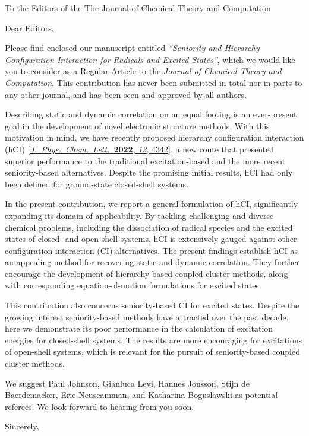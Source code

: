 \documentclass[10pt]{letter}
\begin{document}
\begin{letter}%
{To the Editors of the The Journal of Chemical Theory and Computation}

\opening{Dear Editors,}

\justifying
Please find enclosed our manuscript entitled \textit{``Seniority and Hierarchy Configuration Interaction for Radicals and Excited States''}, 
which we would like you to consider as a Regular Article to the \textit{Journal of Chemical Theory and Computation}.
This contribution has never been submitted in total nor in parts to any other journal, and has been seen and approved by all authors.

Describing static and dynamic correlation on an equal footing is an ever-present goal in the development of novel electronic structure methods.
With this motivation in mind, we have recently proposed hierarchy configuration interaction (hCI)
[\href{https://doi.org/10.1021/acs.jpclett.2c00730}{\textit{J.~Phys.~Chem.~Lett.}~\textbf{2022}, \textit{13}, 4342}],
a new route that presented superior performance to the traditional excitation-based and the more recent seniority-based alternatives.
Despite the promising initial results, hCI had only been defined for ground-state closed-shell systems.

In the present contribution, we report a general formulation of hCI, significantly expanding its domain of applicability.
By tackling challenging and diverse chemical problems, including the dissociation of radical species and the excited states of closed- and open-shell systems,
hCI is extensively gauged against other configuration interaction (CI) alternatives.
The present findings establish hCI as an appealing method for recovering static and dynamic correlation.
They further encourage the development of hierarchy-based coupled-cluster methods, along with corresponding equation-of-motion formulations for excited states.

This contribution also concerns seniority-based CI for excited states.
Despite the growing interest seniority-based methods have attracted over the past decade,
here we demonstrate its poor performance in the calculation of excitation energies for closed-shell systems.
The results are more encouraging for excitations of open-shell systems,
which is relevant for the pursuit of seniority-based coupled cluster methods.

We suggest Paul Johnson, Gianluca Levi, Hannes Jonsson, Stijn de Baerdemacker, Eric Neuscamman, and Katharina Boguslawski as potential referees.
We look forward to hearing from you soon.

\closing{Sincerely,}

\end{letter}
\end{document}
